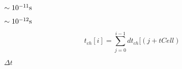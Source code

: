 \documentclass{article}
\begin{document}
$\sim 10^{-11}\textup{s}$
\pagebreak

$\sim 10^{-12}\textup{s}$
\pagebreak

\[
   t_{ch}[i] = \sum_{j = 0}^{i - 1} dt_{ch}[(j + tCell)%
\]
\pagebreak

$ \Delta t$
\pagebreak
\end{document}
